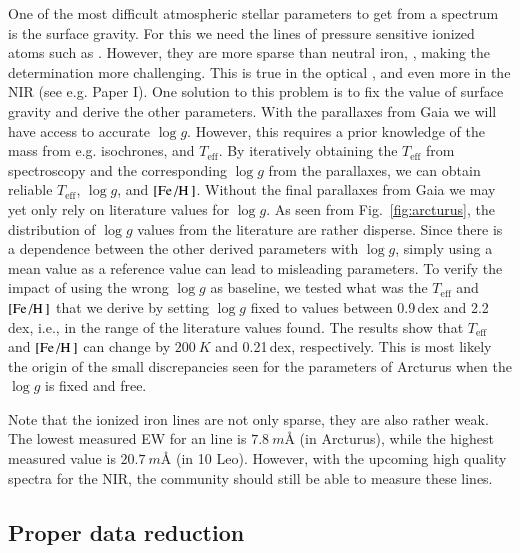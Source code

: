 \documentclass{aa}
\begin{document}
One of the most difficult atmospheric stellar parameters to get from a spectrum
is the surface gravity. For this we need the lines of pressure sensitive ionized
atoms such as . However, they are more sparse than neutral iron,
, making the determination more challenging. This is true in the
optical \citep[see e.g. the discussion by][]{Mortier2013c}, and even more in the
NIR (see e.g. Paper I). One solution to this problem is to fix the value of
surface gravity and derive the other parameters. With the parallaxes from Gaia
\citep{GAIA} we will have access to accurate $\log g$. However, this requires a
prior knowledge of the mass from e.g. isochrones, and $T_\mathrm{eff}$. By
iteratively obtaining the $T_\mathrm{eff}$ from spectroscopy and the
corresponding $\log g$ from the parallaxes, we can obtain reliable
$T_\mathrm{eff}$, $\log g$, and $[\ion{Fe}/\ion{H}]$. Without the final
parallaxes from Gaia we may yet only rely on literature values for $\log g$. As
seen from Fig.~\ref{fig:arcturus}, the distribution of $\log g$ values from the
literature are rather disperse. Since there is a dependence between the other
derived parameters with $\log g$, simply using a mean value as a reference value
can lead to misleading parameters. To verify the impact of using the wrong $\log
g$ as baseline, we tested what was the $T_\mathrm{eff}$ and $[\ion{Fe}/\ion{H}]$
that we derive by setting $\log g$ fixed to values between 0.9\,dex and
2.2\,dex, i.e., in the range of the literature values found. The results show
that $T_\mathrm{eff}$ and $[\ion{Fe}/\ion{H}]$ can change by $\SI{200}{K}$ and
0.21\,dex, respectively. This is most likely the origin of the small
discrepancies seen for the parameters of Arcturus when the $\log g$ is fixed and
free.

Note that the ionized iron lines are not only sparse, they are also rather weak.
The lowest measured EW for an  line is $\SI{7.8}{m}$\AA{} (in
Arcturus), while the highest measured value is $\SI{20.7}{m}$\AA{} (in 10 Leo).
However, with the upcoming high quality spectra for the NIR, the community
should still be able to measure these  lines.


\subsection{Proper data reduction}
\end{document}
